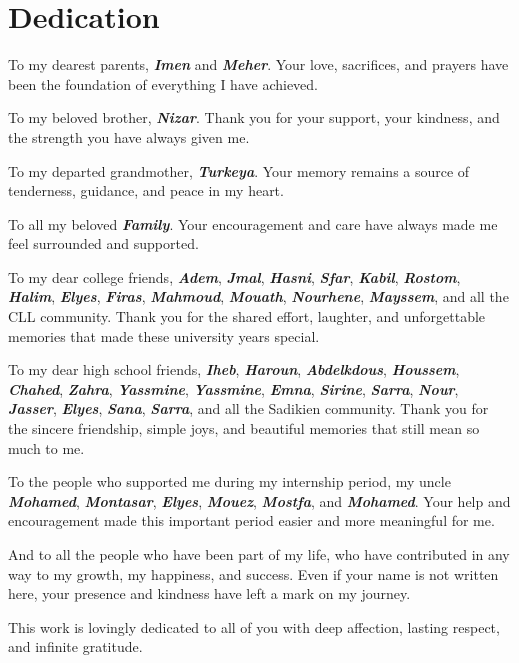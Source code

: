 \chapter*{\Huge Dedication}
\begingroup
\raggedright
\setlength{\parindent}{0pt}
\setlength{\parskip}{0.25cm}

To my dearest parents, \textbf{\textit{Imen}} and \textbf{\textit{Meher}}. Your love, sacrifices, and prayers have been the foundation of everything I have achieved.

To my beloved brother, \textbf{\textit{Nizar}}. Thank you for your support, your kindness, and the strength you have always given me.

To my departed grandmother, \textbf{\textit{Turkeya}}. Your memory remains a source of tenderness, guidance, and peace in my heart.

To all my beloved \textbf{\textit{Family}}. Your encouragement and care have always made me feel surrounded and supported.

To my dear college friends, \textbf{\textit{Adem}}, \textbf{\textit{Jmal}}, \textbf{\textit{Hasni}}, \textbf{\textit{Sfar}}, \textbf{\textit{Kabil}}, \textbf{\textit{Rostom}}, \textbf{\textit{Halim}}, \textbf{\textit{Elyes}}, \textbf{\textit{Firas}}, \textbf{\textit{Mahmoud}}, \textbf{\textit{Mouath}}, \textbf{\textit{Nourhene}}, \textbf{\textit{Mayssem}}, and all the CLL community. Thank you for the shared effort, laughter, and unforgettable memories that made these university years special.

To my dear high school friends, \textbf{\textit{Iheb}}, \textbf{\textit{Haroun}}, \textbf{\textit{Abdelkdous}}, \textbf{\textit{Houssem}}, \textbf{\textit{Chahed}}, \textbf{\textit{Zahra}}, \textbf{\textit{Yassmine}}, \textbf{\textit{Yassmine}}, \textbf{\textit{Emna}}, \textbf{\textit{Sirine}}, \textbf{\textit{Sarra}}, \textbf{\textit{Nour}}, \textbf{\textit{Jasser}}, \textbf{\textit{Elyes}}, \textbf{\textit{Sana}}, \textbf{\textit{Sarra}}, and all the Sadikien community. Thank you for the sincere friendship, simple joys, and beautiful memories that still mean so much to me.

To the people who supported me during my internship period, my uncle \textbf{\textit{Mohamed}}, \textbf{\textit{Montasar}}, \textbf{\textit{Elyes}}, \textbf{\textit{Mouez}}, \textbf{\textit{Mostfa}}, and \textbf{\textit{Mohamed}}. Your help and encouragement made this important period easier and more meaningful for me.

And to all the people who have been part of my life, who have contributed in any way to my growth, my happiness, and success. Even if your name is not written here, your presence and kindness have left a mark on my journey.

This work is lovingly dedicated to all of you with deep affection, lasting respect, and infinite gratitude.

\clearpage
